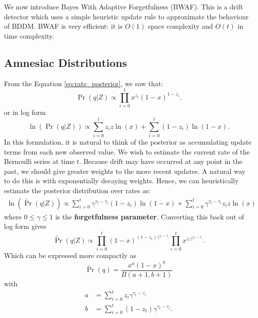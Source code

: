 We now introduce Bayes With Adaptive Forgetfulness (BWAF). This is a drift detector which uses a simple heuristic update rule to approximate the behaviour of BDDM. BWAF is very efficient: it is $O(1)$ space complexity and $O(t)$ in time complexity. 

\subsection{Amnesiac Distributions}

From the Equation \ref{eq:rate_posterior}, we saw that:
\begin{equation}
    \Pr(q|Z) \propto \prod_{i=0}^t x^{z_i}(1-x)^{1-z_i}.
\end{equation}
or in log form
\begin{equation}
    \ln\left(\Pr(q|Z)\right) \propto \sum_{i=0}^t z_i z\ln(x) + \sum_{i=0}^t (1-z_i)\ln(1-x).
\end{equation}
In this formulation, it is natural to think of the posterior as accumulating update terms from each new observed value. We wish to estimate the current rate of the Bernoulli series at time $t$. Because drift may have occurred at any point in the past, we should give greater weights to the more recent updates. A natural way to do this is with exponentially decaying weights. Hence, we can heuristically estimate the posterior distribution over rates as:
\begin{align}
    \ln\left(\overleftarrow{\Pr}(q|Z)\right) \propto \sum_{i=0}^t \gamma^{\tau_t-\tau_i} (1-z_i)\ln(1-x) + \sum_{i=0}^t \gamma^{\tau_t-\tau_i} z_i z\ln(x) \label{eq:horse}
\end{align}
where $0\le\gamma\le 1$ is the {\bf forgetfulness parameter}. Converting this back out of log form gives
\begin{equation}
    \overleftarrow{\Pr}(q|Z) \propto \prod_{i=0}^t (1-x)^{(1-z_t)\gamma^{\tau_t-\tau_i}} \prod_{i=0}^t x^{z_t\gamma^{\tau_t-\tau_i}}.
\end{equation}
Which can be expressed more compactly as
\begin{equation}
    \overleftarrow{\Pr}(q) = \frac{x^a (1-x)^b }{B(a+1,b+1)} \label{eq:banana}
\end{equation}
with
\begin{align}
    a &= \sum_{i=0}^t z_t\gamma^{\tau_t-\tau_i} \\
    b &= \sum_{i=0}^t (1-z_t)\gamma^{\tau_t-\tau_i}.
\end{align}
